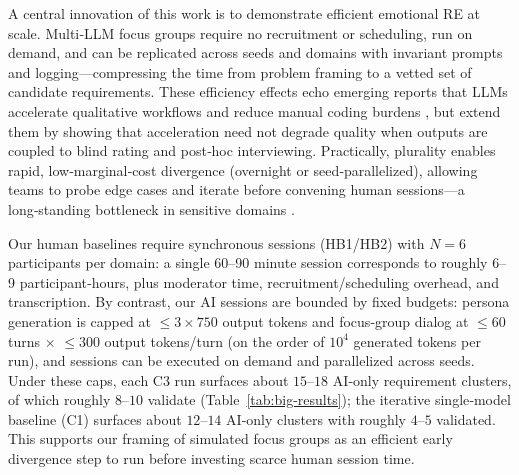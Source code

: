 \documentclass[acmsmall]{acmart}
\begin{document}
A central innovation of this work is to demonstrate efficient emotional RE at scale. Multi‑LLM focus groups require no recruitment or scheduling, run on demand, and can be replicated across seeds and domains with invariant prompts and logging—compressing the time from problem framing to a vetted set of candidate requirements. These efficiency effects echo emerging reports that LLMs accelerate qualitative workflows and reduce manual coding burdens \cite{bano2024large,hayes2025conversing}, but extend them by showing that acceleration need not degrade quality when outputs are coupled to blind rating and post‑hoc interviewing. Practically, plurality enables rapid, low‑marginal‑cost divergence (overnight or seed‑parallelized), allowing teams to probe edge cases and iterate before convening human sessions—a long‑standing bottleneck in sensitive domains \cite{alkhomsan2024eliciting}.

Our human baselines require synchronous sessions (HB1/HB2) with $N{=}6$ participants per domain: a single 60--90 minute session corresponds to roughly 6--9 participant‑hours, plus moderator time, recruitment/scheduling overhead, and transcription. By contrast, our AI sessions are bounded by fixed budgets: persona generation is capped at \(\leq 3\times 750\) output tokens and focus‑group dialog at \(\leq 60\) turns \(\times\) \(\leq 300\) output tokens/turn (on the order of \(10^4\) generated tokens per run), and sessions can be executed on demand and parallelized across seeds. Under these caps, each C3 run surfaces about \(15\)–\(18\) AI‑only requirement clusters, of which roughly \(8\)–\(10\) validate (Table~\ref{tab:big-results}); the iterative single‑model baseline (C1) surfaces about \(12\)–\(14\) AI‑only clusters with roughly \(4\)–\(5\) validated. This supports our framing of simulated focus groups as an efficient early divergence step to run before investing scarce human session time.
\end{document}
